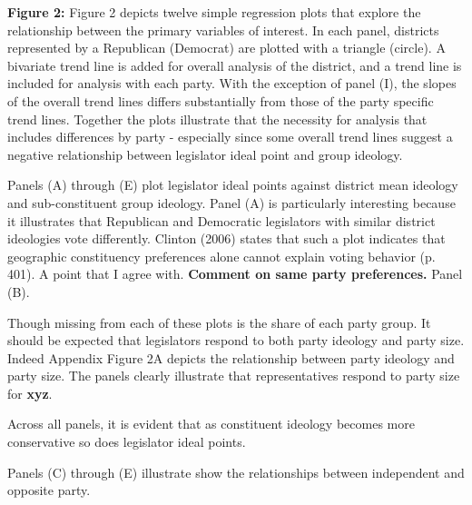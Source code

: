 \documentclass[10pt,letterpaper]{article}
\begin{document}
\textbf{Figure 2:} Figure 2 depicts twelve simple regression plots that explore the relationship between the primary variables of interest. In each panel, districts represented by a Republican (Democrat) are plotted with a triangle (circle). A bivariate trend line is added for overall analysis of the district, and a trend line is included for analysis with each party. With the exception of panel (I), the slopes of the overall trend lines differs substantially from those of the party specific trend lines. Together the plots illustrate that the necessity for analysis that includes differences by party - especially since some overall trend lines suggest a negative relationship between legislator ideal point and group ideology.

Panels (A) through (E) plot legislator ideal points against district mean ideology and sub-constituent group ideology. Panel (A) is particularly interesting because it illustrates that Republican and Democratic legislators with similar district ideologies vote differently. Clinton (2006) states that such a plot indicates that geographic constituency preferences alone cannot explain voting behavior (p. 401). A point that I agree with. \textbf{Comment on same party preferences.} Panel (B).

Though missing from each of these plots is the share of each party group. It should be expected that legislators respond to both party ideology and party size. Indeed Appendix Figure 2A depicts the relationship between party ideology and party size. The panels clearly illustrate that representatives respond to party size for \textbf{xyz}. 

Across all panels, it is evident that as constituent ideology becomes more conservative so does legislator ideal points.

Panels (C) through (E) illustrate show the relationships between independent and opposite party.
\end{document}
